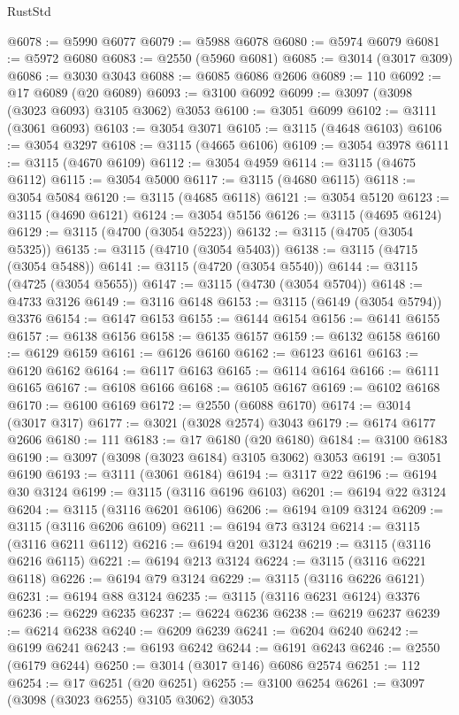 \begin{lexlean}{RustStd}
\begin{coremodule}
{\begin{coremodule}
{{{{{{{{{{{{{{{{{{{{{{{{{{{{{{{{@6078 := @5990 @6077
@6079 := @5988 @6078
@6080 := @5974 @6079
@6081 := @5972 @6080
@6083 := @2550 (@5960 @6081)
@6085 := @3014 (@3017 @309)
@6086 := @3030 @3043
@6088 := @6085 @6086 @2606
@6089 := 110
@6092 := @17 @6089 (@20 @6089)
@6093 := @3100 @6092
@6099 := @3097 (@3098 (@3023 @6093) @3105 @3062) @3053
@6100 := @3051 @6099
@6102 := @3111 (@3061 @6093)
@6103 := @3054 @3071
@6105 := @3115 (@4648 @6103)
@6106 := @3054 @3297
@6108 := @3115 (@4665 @6106)
@6109 := @3054 @3978
@6111 := @3115 (@4670 @6109)
@6112 := @3054 @4959
@6114 := @3115 (@4675 @6112)
@6115 := @3054 @5000
@6117 := @3115 (@4680 @6115)
@6118 := @3054 @5084
@6120 := @3115 (@4685 @6118)
@6121 := @3054 @5120
@6123 := @3115 (@4690 @6121)
@6124 := @3054 @5156
@6126 := @3115 (@4695 @6124)
@6129 := @3115 (@4700 (@3054 @5223))
@6132 := @3115 (@4705 (@3054 @5325))
@6135 := @3115 (@4710 (@3054 @5403))
@6138 := @3115 (@4715 (@3054 @5488))
@6141 := @3115 (@4720 (@3054 @5540))
@6144 := @3115 (@4725 (@3054 @5655))
@6147 := @3115 (@4730 (@3054 @5704))
@6148 := @4733 @3126
@6149 := @3116 @6148
@6153 := @3115 (@6149 (@3054 @5794)) @3376
@6154 := @6147 @6153
@6155 := @6144 @6154
@6156 := @6141 @6155
@6157 := @6138 @6156
@6158 := @6135 @6157
@6159 := @6132 @6158
@6160 := @6129 @6159
@6161 := @6126 @6160
@6162 := @6123 @6161
@6163 := @6120 @6162
@6164 := @6117 @6163
@6165 := @6114 @6164
@6166 := @6111 @6165
@6167 := @6108 @6166
@6168 := @6105 @6167
@6169 := @6102 @6168
@6170 := @6100 @6169
@6172 := @2550 (@6088 @6170)
@6174 := @3014 (@3017 @317)
@6177 := @3021 (@3028 @2574) @3043
@6179 := @6174 @6177 @2606
@6180 := 111
@6183 := @17 @6180 (@20 @6180)
@6184 := @3100 @6183
@6190 := @3097 (@3098 (@3023 @6184) @3105 @3062) @3053
@6191 := @3051 @6190
@6193 := @3111 (@3061 @6184)
@6194 := @3117 @22
@6196 := @6194 @30 @3124
@6199 := @3115 (@3116 @6196 @6103)
@6201 := @6194 @22 @3124
@6204 := @3115 (@3116 @6201 @6106)
@6206 := @6194 @109 @3124
@6209 := @3115 (@3116 @6206 @6109)
@6211 := @6194 @73 @3124
@6214 := @3115 (@3116 @6211 @6112)
@6216 := @6194 @201 @3124
@6219 := @3115 (@3116 @6216 @6115)
@6221 := @6194 @213 @3124
@6224 := @3115 (@3116 @6221 @6118)
@6226 := @6194 @79 @3124
@6229 := @3115 (@3116 @6226 @6121)
@6231 := @6194 @88 @3124
@6235 := @3115 (@3116 @6231 @6124) @3376
@6236 := @6229 @6235
@6237 := @6224 @6236
@6238 := @6219 @6237
@6239 := @6214 @6238
@6240 := @6209 @6239
@6241 := @6204 @6240
@6242 := @6199 @6241
@6243 := @6193 @6242
@6244 := @6191 @6243
@6246 := @2550 (@6179 @6244)
@6250 := @3014 (@3017 @146) @6086 @2574
@6251 := 112
@6254 := @17 @6251 (@20 @6251)
@6255 := @3100 @6254
@6261 := @3097 (@3098 (@3023 @6255) @3105 @3062) @3053
}}}}}}}}}}}}}}}}}}}}}}}}}}}}}}}}
\end{coremodule}}
\end{coremodule}
\end{lexlean}
